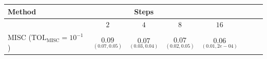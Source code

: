 %	
%	
%
%
%
\begin{table}[h!]
	\centering
	\begin{tabular}{l*{6}{c}r}
	\toprule[1.5pt]
	Method & & Steps  & &     \\
	\hline	
		         & $2$ & $4$ & $8$ & $16$  \\
		\hline

		MISC ($\text{TOL}_{\text{MISC}}=10^{-1}$)  & $\underset{(0.07,0.05)}{\mathbf{0.09}}$ & $\underset{(0.03,0.04)}{\mathbf{0.07}}$& $\underset{(0.02,0.05)}{\mathbf{ 0.07}}$ & $\underset{(0.01,2e-04)}{\mathbf{ 0.06}}$   \\


\end{tabular}
\end{table}
